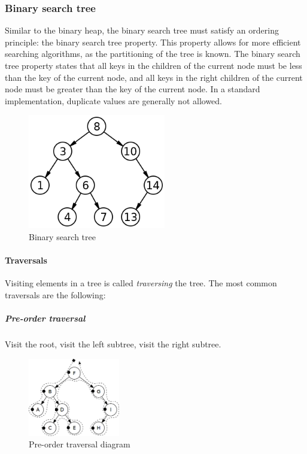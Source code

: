 \documentclass{article}
\begin{document}
{\subsubsection{Binary search tree}
Similar to the binary heap, the binary search tree must satisfy an ordering principle: the binary search tree
property. This property allows for more efficient searching algorithms, as the partitioning of the tree is known.
The binary search tree property states that all keys in the children of the current node must be less than the key
of the current node, and all keys in the right children of the current node must be greater than the key of the
current node. In a standard implementation, duplicate values are generally not allowed.

\begin{figure}[H]
    \centering
    \includegraphics[width=6cm]{binary_search_tree}
    \caption{Binary search tree}
  \end{figure}




\begin{samepage}
  \paragraph{Traversals}
  Visiting elements in a tree is called {\em traversing} the tree. The most common traversals are the following:

  \subparagraph{Pre-order traversal}
  Visit the root, visit the left subtree, visit the right subtree.

  \begin{figure}[H]
    \centering
    \includegraphics[width=4cm]{pre_order_traversal}
    \caption{Pre-order traversal diagram}
  \end{figure}


\end{samepage}}
\end{document}
